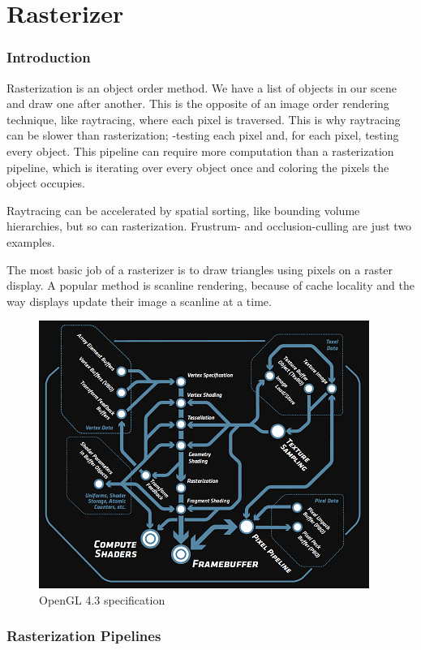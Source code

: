 \part{Rasterizer}


\section{Introduction}
Rasterization is an object order method. We have a list of objects in our scene and draw one after another. This is the opposite of an image order rendering technique, like raytracing, where each pixel is traversed. This is why raytracing can be slower than rasterization; -testing each pixel and, for each pixel, testing every object. This pipeline can require more computation than a rasterization pipeline, which is iterating over every object once and coloring the pixels the object occupies.

Raytracing can be accelerated by spatial sorting, like bounding volume hierarchies, but so can rasterization. Frustrum- and occlusion-culling are just two examples.

The most basic job of a rasterizer is to draw triangles using pixels on a raster display. A popular method is scanline rendering, because of cache locality and the way displays update their image a scanline at a time.

\begin{figure}[H]
  \centering
  \includegraphics{Media/opengl43.png}
  \caption{OpenGL 4.3 specification}   
  \label{fig:OpenGL43Spec}
\end{figure}

\section{Rasterization Pipelines}



